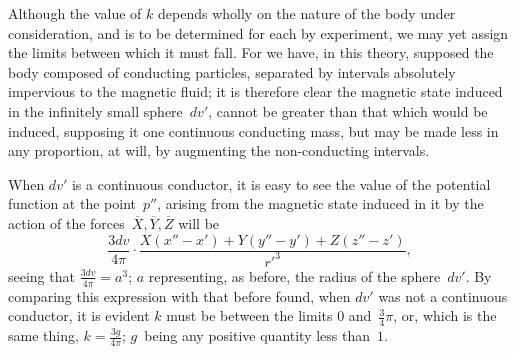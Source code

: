 \documentclass[11pt,notitlepage]{amsart}
\begin{document}
Although the value of $k$ depends wholly on the nature of the body
under consideration, and is to be determined for each by experiment, we may
yet assign the limits between which it must fall. For we have, in this theory,
supposed the body composed of conducting particles, separated by intervals
absolutely impervious to the magnetic fluid; it is therefore clear the magnetic
state induced in the infinitely small sphere~$dv'$, cannot be greater than that
which would be induced, supposing it one continuous conducting mass, but
may be made less in any proportion, at will, by augmenting the non-conducting
intervals.

When $dv'$ is a continuous conductor, it is easy to see the value of
the potential function at the point~$p''$,
arising from the magnetic state induced
in it by the action of the forces~$\overline{X},\overline{Y},\overline{Z}$
will be
\[
\frac{3dv}{4\pi}\cdot
\frac{X(x''-x')+Y(y''-y')+Z(z''-z')}{r'^3},
\]
seeing that $\frac{3dv}{4\pi}=a^3$;
$a$ representing, as before, the radius of the sphere~$dv'$.
By comparing this expression with that before found, when $dv'$ was not a
continuous conductor, it is evident $k$ must be between
the limits $0$ and~$\frac34\pi$,
or, which is the same thing, ${k=\frac{3g}{4\pi}}$;
$g$~being any positive quantity less than~$1$.
\end{document}
